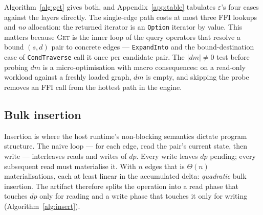\documentclass[11pt,a4paper]{article}
\theoremstyle{plain}
\theoremstyle{definition}
\theoremstyle{remark}
\begin{document}
Algorithm~\ref{alg:get} gives both, and Appendix~\ref{app:table} tabulates
$\varepsilon$'s four cases against the layers directly.
The single-edge path costs at most three FFI lookups and \emph{no}
allocation: the returned iterator is an \texttt{Option} iterator by value.
This matters because \textsc{Get} is the inner loop of the query operators
that resolve a bound $(s,d)$ pair to concrete edges --- \texttt{ExpandInto}
and the bound-destination case of \texttt{CondTraverse} call it once per
candidate pair. The $|dm| \neq 0$ test before probing $dm$ is a
micro-optimisation with macro consequences: on a read-only workload against a
freshly loaded graph, $dm$ is empty, and skipping the probe removes an FFI
call from the hottest path in the engine.

\subsection{Bulk insertion}
\label{sec:insert}

Insertion is where the host runtime's non-blocking semantics dictate program
structure. The naive loop --- for each edge, read the pair's current state,
then write --- interleaves reads and writes of $dp$. Every write leaves $dp$
pending; every subsequent read must materialise it. With $n$ edges that is
$\Theta(n)$ materialisations, each at least linear in the accumulated delta:
\emph{quadratic} bulk insertion. The artifact therefore splits the operation
into a read phase that touches $dp$ only for reading and a write phase that
touches it only for writing (Algorithm~\ref{alg:insert}).
\end{document}
